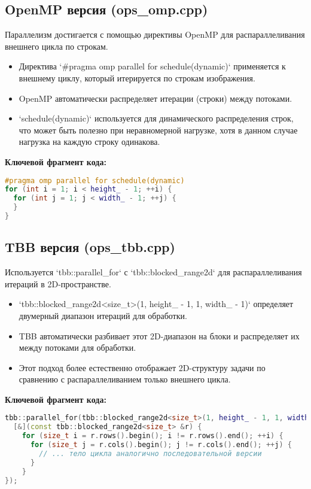 \documentclass[12pt,a4paper]{extarticle}
\begin{document}
\subsection{OpenMP версия (ops\_omp.cpp)}
Параллелизм достигается с помощью директивы OpenMP для распараллеливания внешнего цикла по строкам.
\begin{itemize}
    \item Директива `\#pragma omp parallel for schedule(dynamic)` применяется к внешнему циклу, который итерируется по строкам изображения.
    \item OpenMP автоматически распределяет итерации (строки) между потоками.
    \item `schedule(dynamic)` используется для динамического распределения строк, что может быть полезно при неравномерной нагрузке, хотя в данном случае нагрузка на каждую строку одинакова.
\end{itemize}

\textbf{Ключевой фрагмент кода:}
\begin{lstlisting}[language=C++]
#pragma omp parallel for schedule(dynamic)
for (int i = 1; i < height_ - 1; ++i) {
  for (int j = 1; j < width_ - 1; ++j) {
  }
}
\end{lstlisting}

\subsection{TBB версия (ops\_tbb.cpp)}
Используется `tbb::parallel_for` с `tbb::blocked_range2d` для распараллеливания итераций в 2D-пространстве.
\begin{itemize}
    \item `tbb::blocked_range2d<size_t>(1, height_ - 1, 1, width_ - 1)` определяет двумерный диапазон итераций для обработки.
    \item TBB автоматически разбивает этот 2D-диапазон на блоки и распределяет их между потоками для обработки.
    \item Этот подход более естественно отображает 2D-структуру задачи по сравнению с распараллеливанием только внешнего цикла.
\end{itemize}

\textbf{Ключевой фрагмент кода:}
\begin{lstlisting}[language=C++]
tbb::parallel_for(tbb::blocked_range2d<size_t>(1, height_ - 1, 1, width_ - 1),
  [&](const tbb::blocked_range2d<size_t> &r) {
    for (size_t i = r.rows().begin(); i != r.rows().end(); ++i) {
      for (size_t j = r.cols().begin(); j != r.cols().end(); ++j) {
        // ... тело цикла аналогично последовательной версии
      }
    }
});
\end{lstlisting}
\end{document}
